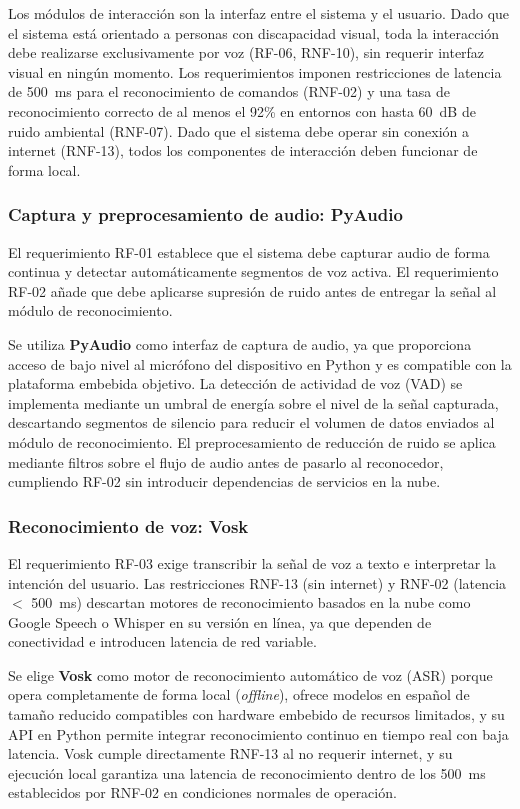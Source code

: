 Los módulos de interacción son la interfaz entre el sistema y el usuario. Dado que
el sistema está orientado a personas con discapacidad visual, toda la interacción
debe realizarse exclusivamente por voz (RF-06, RNF-10), sin requerir interfaz visual
en ningún momento. Los requerimientos imponen restricciones de latencia de 500~ms para
el reconocimiento de comandos (RNF-02) y una tasa de reconocimiento correcto de al
menos el 92\% en entornos con hasta 60~dB de ruido ambiental (RNF-07). Dado que
el sistema debe operar sin conexión a internet (RNF-13), todos los componentes de
interacción deben funcionar de forma local.

\subsubsection{Captura y preprocesamiento de audio: PyAudio}

El requerimiento RF-01 establece que el sistema debe capturar audio de forma continua
y detectar automáticamente segmentos de voz activa. El requerimiento RF-02 añade que
debe aplicarse supresión de ruido antes de entregar la señal al módulo de
reconocimiento.

Se utiliza \textbf{PyAudio} como interfaz de captura de audio, ya que proporciona
acceso de bajo nivel al micrófono del dispositivo en Python y es compatible con la
plataforma embebida objetivo. La detección de actividad de voz (VAD) se implementa
mediante un umbral de energía sobre el nivel de la señal capturada, descartando
segmentos de silencio para reducir el volumen de datos enviados al módulo de
reconocimiento. El preprocesamiento de reducción de ruido se aplica mediante filtros
sobre el flujo de audio antes de pasarlo al reconocedor, cumpliendo RF-02 sin
introducir dependencias de servicios en la nube.

\subsubsection{Reconocimiento de voz: Vosk}

El requerimiento RF-03 exige transcribir la señal de voz a texto e interpretar la
intención del usuario. Las restricciones RNF-13 (sin internet) y RNF-02 (latencia
$<$ 500~ms) descartan motores de reconocimiento basados en la nube como Google Speech
o Whisper en su versión en línea, ya que dependen de conectividad e introducen latencia
de red variable.

Se elige \textbf{Vosk} como motor de reconocimiento automático de voz (ASR) porque
opera completamente de forma local (\textit{offline}), ofrece modelos en español de
tamaño reducido compatibles con hardware embebido de recursos limitados, y su API en
Python permite integrar reconocimiento continuo en tiempo real con baja latencia. Vosk
cumple directamente RNF-13 al no requerir internet, y su ejecución local garantiza una
latencia de reconocimiento dentro de los 500~ms establecidos por RNF-02 en condiciones
normales de operación.

